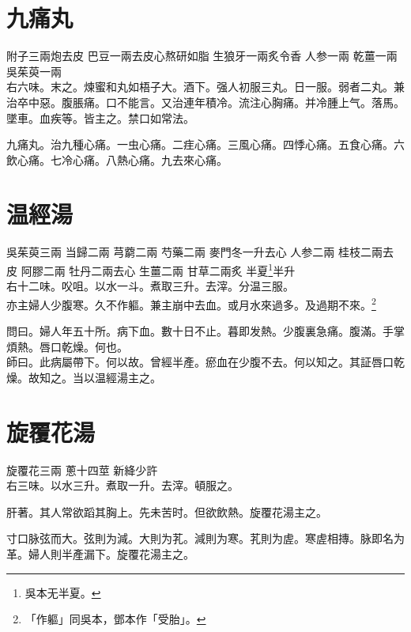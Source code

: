 \section{九痛丸}

附子{\scriptsize 三兩炮去皮} 巴豆{\scriptsize 一兩去皮心熬研如脂} 生狼牙{\scriptsize 一兩炙令香} 人参{\scriptsize 一兩} 乾薑{\scriptsize 一兩} 吳茱萸{\scriptsize 一兩}\\
右六味。末之。煉蜜和丸如梧子大。酒下。强人初服三丸。日一服。弱者二丸。兼治卒中惡。腹脹痛。口不能言。又治連年積冷。流注心胸痛。并冷腫上气。落馬。墜車。血疾等。皆主之。禁口如常法。{\wuben}

{\dengben}%

九痛丸。治九種心痛。{\khaai 一虫心痛。二疰心痛。三風心痛。四悸心痛。五食心痛。六飲心痛。七冷心痛。八熱心痛。九去來心痛。}

\section{温經湯}

吳茱萸{\scriptsize 三兩} 当歸{\scriptsize 二兩} 芎藭{\scriptsize 二兩} 芍藥{\scriptsize 二兩} 麥門冬{\scriptsize 一升去心} 人参{\scriptsize 二兩} 桂枝{\scriptsize 二兩去皮} 阿膠{\scriptsize 二兩} 牡丹{\scriptsize 二兩去心} 生薑{\scriptsize 二兩} 甘草{\scriptsize 二兩炙} 半夏{\footnote{吳本无半夏。}}{\scriptsize 半升}\\
右十二味。㕮咀。以水一斗。煮取三升。去滓。分温三服。\\
亦主婦人少腹寒。久不作軀。兼主崩中去血。或月水來過多。及過期不來。\footnote{「作軀」同吳本，鄧本作「受胎」。}

問曰。婦人年五十所。病下血。數十日不止。暮即发熱。少腹裏急{\khaai 痛}。腹滿。手掌煩熱。唇口乾燥。何也。\\
師曰。此病屬帶下。何以故。曾經半產。瘀血在少腹不去。何以知之。其証唇口乾燥。故知之。当以温經湯主之。

\section{旋覆花湯}

旋覆花{\scriptsize 三兩} 蔥{\scriptsize 十四莖} 新絳{\scriptsize 少許}\\
右三味。以水三升。煮取一升。去滓。頓服之。

肝著。其人常欲蹈其胸上。先未苦时。但欲飲熱。旋覆花湯主之。

寸口脉弦而大。弦則为減。大則为芤。減則为寒。芤則为虗。寒虗相摶。脉即名为革。婦人則半產漏下。旋覆花湯主之。

